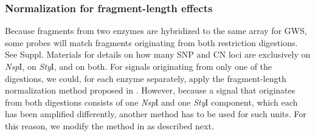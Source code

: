 \documentclass{bioinfo}
\newcommand{\GWS}{GWS\xspace}
\newcommand{\GWSSix}{GWS6\xspace}
\newcommand{\NspI}{\emph{Nsp}I\xspace}
\newcommand{\StyI}{\emph{Sty}I\xspace}
\begin{document}
\subsubsection{Normalization for fragment-length effects}
\label{secFLnorm}
Because fragments from two enzymes are hybridized to the same array for \GWS, some probes will match fragments originating from both restriction digestions.  See Suppl. Materials for details on how many SNP and CN loci are exclusively on \NspI, on \StyI, and on both.
For signals originating from only one of the digestions, we could, for each enzyme separately, apply the fragment-length normalization method proposed in \citet{BengtssonH_etal_2008a}.  However, because a signal that originates from both digestions consists of one \NspI and one \StyI component, which each has been amplified differently, another method has to be used for such units.  For this reason, we modify the method in \citet{BengtssonH_etal_2008a} as described next. 
\end{document}
